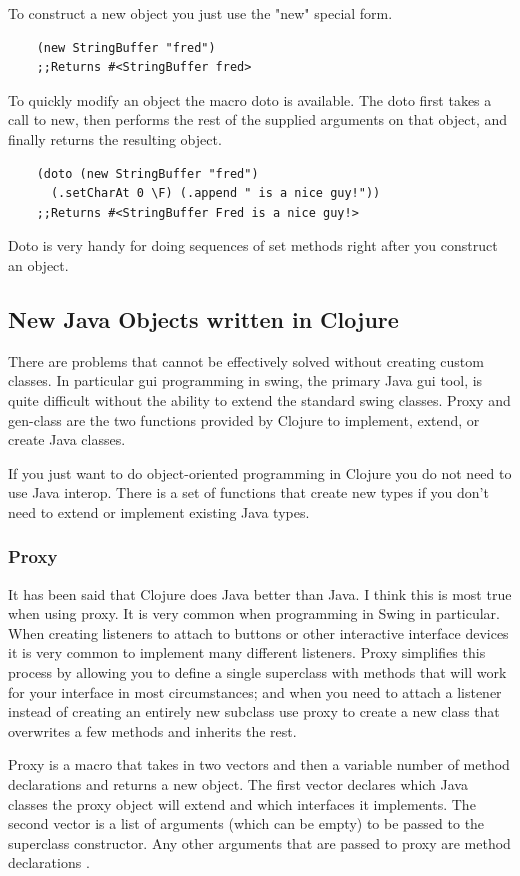\documentclass[12pt]{article}
\begin{document}
	To construct a new object you just use the "new" special form.
	\begin{verbatim}
	(new StringBuffer "fred")
	;;Returns #<StringBuffer fred>
	\end{verbatim} 
	
	To quickly modify an object the macro doto is available. The doto first takes a call to new, then performs the rest of the supplied arguments on that object, and finally returns the resulting object.
	\begin{verbatim}
	(doto (new StringBuffer "fred") 
	  (.setCharAt 0 \F) (.append " is a nice guy!"))
	;;Returns #<StringBuffer Fred is a nice guy!>
	\end{verbatim}
	Doto is very handy for doing sequences of set methods right after you construct an object.
	
	\subsection{New Java Objects written in Clojure}
	There are problems that cannot be effectively solved without creating custom classes. In particular gui programming in swing, the primary Java gui tool, is quite difficult without the ability to extend the standard swing classes. Proxy and gen-class are the two functions provided by Clojure to implement, extend, or create Java classes. 
	
	If you just want to do object-oriented programming in Clojure you do not need to use Java interop. There is a set of functions that create new types if you don't need to extend or implement existing Java types.
	
	\subsubsection{Proxy}
	It has been said that Clojure does Java better than Java\cite{halloway:better}. I think this is most true when using proxy. It is very common when programming in Swing in particular. When creating listeners to attach to buttons or other interactive interface devices it is very common to implement many different listeners. Proxy simplifies this process by allowing you to define a single superclass with methods that will work for your interface in most circumstances; and when you need to attach a listener instead of creating an entirely new subclass use proxy to create a new class that overwrites a few methods and inherits the rest. 
	
	Proxy is a macro that takes in two vectors and then a variable number of method declarations and returns a new object. The first vector declares which Java classes the proxy object will extend and which interfaces it implements. The second vector is a list of arguments (which can be empty) to be passed to the superclass constructor. Any other arguments that are passed to proxy are method declarations \cite{cloj:interop}. 
	
\end{document}
